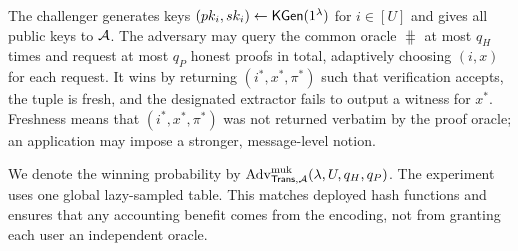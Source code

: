 The challenger generates keys $(pk_i,sk_i)\leftarrow\mathsf{KGen}(1^\lambda)$ for
$i\in[U]$ and gives all public keys to $\mathcal{A}$.  The adversary may query the
common oracle $\hash$ at most $q_H$ times and request at most $q_P$ honest
proofs in total, adaptively choosing $(i,x)$ for each request.  It wins by
returning $(i^*,x^*,\pi^*)$ such that verification accepts, the tuple is fresh,
and the designated extractor fails to output a witness for $x^*$.  Freshness
means that $(i^*,x^*,\pi^*)$ was not returned verbatim by the proof oracle; an
application may impose a stronger, message-level notion.

We denote the winning probability by
$\operatorname{Adv}^{\mathrm{muk}}_{\mathsf{Trans},\mathcal{A}}(\lambda,U,q_H,q_P)$.
The experiment uses one global lazy-sampled table.  This matches deployed hash
functions and ensures that any accounting benefit comes from the encoding,
not from granting each user an independent oracle.
